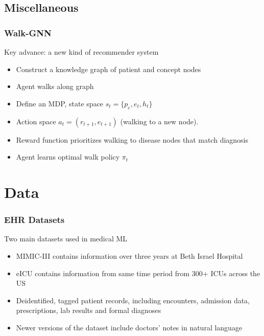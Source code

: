 \documentclass{beamer}
\begin{document}

\subsection{Miscellaneous}


\begin{frame}
    \frametitle{Walk-GNN}
	Key advance: a new kind of recommender system	
    \begin{itemize}
        \item Construct a knowledge graph of patient and concept nodes
        \item Agent walks along graph 
        \item Define an MDP, state space $s_t = \{p_e,e_t,h_t\}$
        \item Action space $a_t = (r_{t+1},e_{t+1})$ (walking to a new node).
        \item Reward function prioritizes walking to disease nodes that match diagnosis
        \item Agent learns optimal walk policy $\pi_t$
        
    \end{itemize}
    

    \end{frame}
    


\section{Data}


\begin{frame}
    \frametitle{EHR Datasets}
	Two main datasets used in medical ML

    \begin{itemize}
        \item MIMIC-III contains information over three years at Beth Israel Hospital
        \item eICU contains information from same time period from 300+ ICUs across the US
        \item Deidentified, tagged patient records, including encounters, admission data, prescriptions, lab results and formal diagnoses
        \item Newer versions of the dataset include doctors' notes in natural language
    \end{itemize}
    

    \end{frame}
\end{document}
